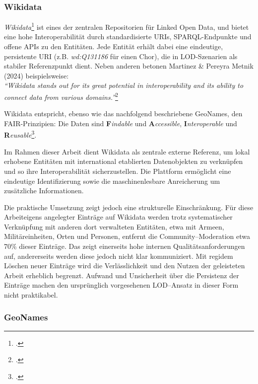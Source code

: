 \documentclass[12pt, a4paper, ngerman, bidi=default]{article}
\let\cite\footcite
\begin{document}
\subsubsection{Wikidata}

\textit{Wikidata}\cite[vgl.][]{noauthor_wikidata_nodate} ist eines der zentralen Repositorien für Linked Open Data, und bietet eine hohe Interoperabilität durch standardisierte
URIs, SPARQL-Endpunkte und offene APIs zu den Entitäten.
Jede Entität erhält dabei eine eindeutige, persistente URI 
(z.B. \colorbox{VeryLightGray}{\textit{wd:Q131186}} für einen Chor), die in LOD-Szenarien 
als stabiler Referenzpunkt dient.
Neben anderen betonen Martinez \& Pereyra Metnik (2024) beispielsweise: \\
\textit{\enquote{Wikidata stands out for its great potential in interoperability and its ability to connect data from various domains.}}\cite{martinez_comparative_nodate}

Wikidata entspricht, ebenso wie das nachfolgend beschriebene GeoNames, den FAIR-Prinzipien: Die Daten sind 
\textbf{F}\textit{indable} und \textbf{A}\textit{ccessible}, \textbf{I}\textit{nteroperable} und \textbf{R}\textit{eusable}\cite[ vgl.][S. 2]{wilkinson_fair_2016}.

Im Rahmen dieser Arbeit dient Wikidata als zentrale externe Referenz, um lokal erhobene Entitäten mit international etablierten Datenobjekten 
zu verknüpfen und so ihre Interoperabilität sicherzustellen. Die Plattform ermöglicht eine eindeutige Identifizierung sowie die maschinenlesbare 
Anreicherung um zusätzliche Informationen.

Die praktische Umsetzung zeigt jedoch eine strukturelle Einschränkung. Für diese Arbeiteigens angelegter Einträge auf Wikidata werden
trotz systematischer Verknüpfung mit anderen dort verwalteten Entitäten, etwa mit Armeen, Militäreinheiten, Orten und Personen, entfernt die Community–Moderation etwa 70\% dieser Einträge. 
Das zeigt einerseits hohe internen Qualitätsanforderungen auf, andererseits werden diese jedoch nicht klar kommuniziert. Mit regidem Löschen neuer Einträge wird die Verlässlichkeit und den Nutzen der 
geleisteten Arbeit erheblich begrenzt. 
Aufwand und Unsicherheit über die Persistenz der Einträge machen den ursprünglich vorgesehenen LOD–Ansatz in dieser Form nicht praktikabel.

\subsubsection{GeoNames}\label{subsubsec:geonames}
\end{document}
